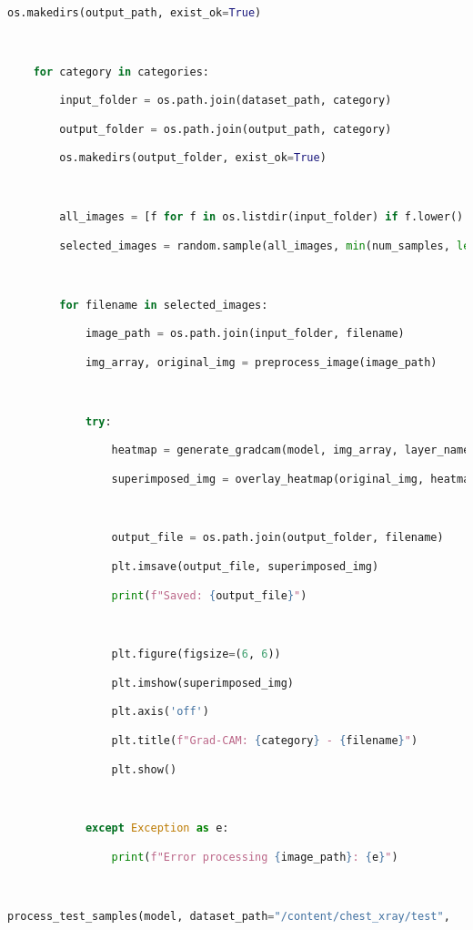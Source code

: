 \documentclass{article}
\begin{document}
\begin{lstlisting}[style=mystyle,language=Python]
    os.makedirs(output_path, exist_ok=True)



    for category in categories:

        input_folder = os.path.join(dataset_path, category)

        output_folder = os.path.join(output_path, category)

        os.makedirs(output_folder, exist_ok=True)



        all_images = [f for f in os.listdir(input_folder) if f.lower().endswith(('.jpg', '.jpeg', '.png'))]

        selected_images = random.sample(all_images, min(num_samples, len(all_images)))



        for filename in selected_images:

            image_path = os.path.join(input_folder, filename)

            img_array, original_img = preprocess_image(image_path)



            try:

                heatmap = generate_gradcam(model, img_array, layer_name)

                superimposed_img = overlay_heatmap(original_img, heatmap)



                output_file = os.path.join(output_folder, filename)

                plt.imsave(output_file, superimposed_img)

                print(f"Saved: {output_file}")



                plt.figure(figsize=(6, 6))

                plt.imshow(superimposed_img)

                plt.axis('off')

                plt.title(f"Grad-CAM: {category} - {filename}")

                plt.show()



            except Exception as e:

                print(f"Error processing {image_path}: {e}")



process_test_samples(model, dataset_path="/content/chest_xray/test",


\end{lstlisting}
\end{document}
